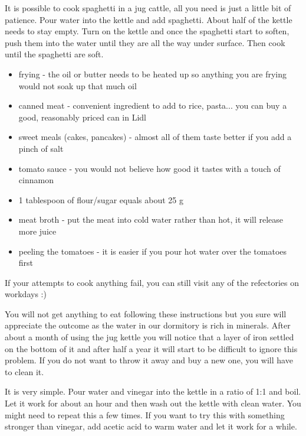 It is possible to cook spaghetti in a jug cattle, all you need is just a little
bit of patience. Pour water into the kettle and add spaghetti. About half of the
kettle needs to stay empty. Turn on the kettle and once the spaghetti start to
soften, push them into the water until they are all the way under surface. Then
cook until the spaghetti are soft.


\begin{itemize}
\item frying - the oil or butter needs to be heated up so anything you are
frying would not soak up that much oil
\item canned meat - convenient ingredient to add to rice, pasta... you can buy a
good, reasonably priced can in Lidl
\item sweet meals (cakes, pancakes) - almost all of them taste better if you add
a pinch of salt
\item tomato sauce - you would not believe how good it tastes with a touch of
cinnamon
\item 1 tablespoon of flour/sugar equals about 25 g
\item meat broth - put the meat into cold water rather than hot, it will release
more juice
\item peeling the tomatoes - it is easier if you pour hot water over the
tomatoes first
\end{itemize}

If your attempts to cook anything fail, you can still visit any of the
refectories on workdays :)

You will not get anything to eat following these instructions but you sure will
appreciate the outcome as the water in our dormitory is rich in minerals.
After about a month of using the jug kettle you will notice that a layer of iron
settled on the bottom of it and after half a year it will start to be difficult
to ignore this problem. If you do not want to throw it away and buy a new one,
you will have to clean it.

It is very simple. Pour water and vinegar into the kettle in a ratio of 1:1 and
boil. Let it work for about an hour and then wash out the kettle with clean
water. You might need to repeat this a few times.
If you want to try this with something stronger than vinegar, add acetic acid to
warm water and let it work for a while.